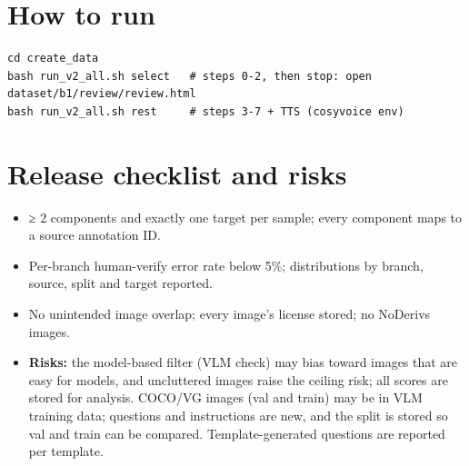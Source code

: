 \documentclass[10.5pt]{article}
\begin{document}
\section{How to run}
\begin{Verbatim}[fontsize=\small,frame=single]
cd create_data
bash run_v2_all.sh select   # steps 0-2, then stop: open dataset/b1/review/review.html
bash run_v2_all.sh rest     # steps 3-7 + TTS (cosyvoice env)
\end{Verbatim}

\section{Release checklist and risks}
\begin{itemize}
\item ≥ 2 components and exactly one target per sample; every component maps to a source annotation ID.
\item Per-branch human-verify error rate below 5\%; distributions by branch, source, split and target reported.
\item No unintended image overlap; every image's license stored; no NoDerivs images.
\item \textbf{Risks:} the model-based filter (VLM check) may bias toward images that are easy for models,
  and uncluttered images raise the ceiling risk; all scores are stored for analysis. COCO/VG images (val and
  train) may be in VLM training data; questions and instructions are new, and the split is stored so val and
  train can be compared. Template-generated questions are reported per template.
\end{itemize}
\end{document}
